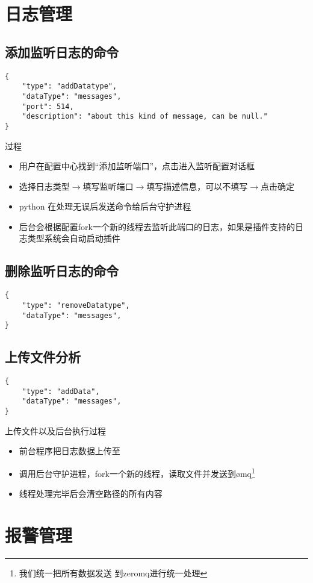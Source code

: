 \documentclass{article}
\begin{document}
\section{日志管理}
\subsection{添加监听日志的命令}
\begin{verbatim}
{
    "type": "addDatatype",
    "dataType": "messages",
    "port": 514,
    "description": "about this kind of message, can be null."
}
\end{verbatim}
\textsf{过程}
\begin{itemize}
\item[(1)] 用户在配置中心找到“添加监听端口”，点击进入监听配置对话框
\item[(2)] 选择日志类型$\rightarrow$填写监听端口$\rightarrow$填写描述信息，可以不填写$\rightarrow$点击确定
\item[(3)] python 在处理无误后发送命令给后台守护进程
\item[(4)] 后台会根据配置fork一个新的线程去监听此端口的日志，如果是插件支持的日志类型系统会自动启动插件
\end{itemize}


\subsection{删除监听日志的命令}
\begin{verbatim}
{
    "type": "removeDatatype",
    "dataType": "messages",
}
\end{verbatim}

\subsection{上传文件分析}
\begin{verbatim}
{
    "type": "addData",
    "dataType": "messages",
}
\end{verbatim}
\textsf{上传文件以及后台执行过程}
\begin{itemize}
\item[(1)] 前台程序把日志数据上传至
\item[(2)] 调用后台守护进程，fork一个新的线程，读取文件并发送到\o mq\footnote{我们统一把所有数据发送
到zeromq进行统一处理}
\item[(3)] 线程处理完毕后会清空路径的所有内容
\end{itemize}
\section{报警管理}
\end{document}
